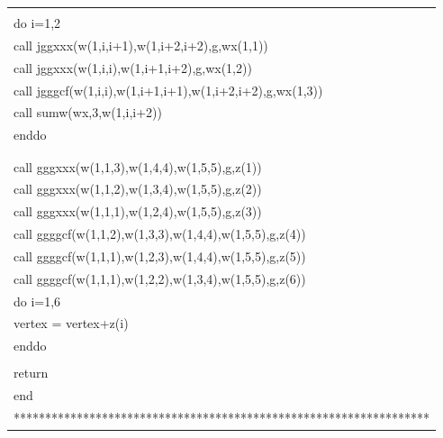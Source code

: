 \documentclass[a4paper,11pt]{article}
\begin{document}
\begin{center}
{\begin{supertabular}{l}
\\
         \\
      \hspace{0.5em} do i=1,2  \\
      \hspace{1em}    call jggxxx(w(1,i,i+1),w(1,i+2,i+2),g,wx(1,1))\\
      \hspace{1em}    call jggxxx(w(1,i,i),w(1,i+1,i+2),g,wx(1,2))    \\
      \hspace{1em}    call jgggcf(w(1,i,i),w(1,i+1,i+1),w(1,i+2,i+2),g,wx(1,3)) \\
      \hspace{1em}    call sumw(wx,3,w(1,i,i+2))\\
      \hspace{0.5em} enddo   \\
      \\
      \\
      \hspace{0.5em} call gggxxx(w(1,1,3),w(1,4,4),w(1,5,5),g,z(1))   \\
      \hspace{0.5em} call gggxxx(w(1,1,2),w(1,3,4),w(1,5,5),g,z(2))     \\
      \hspace{0.5em} call gggxxx(w(1,1,1),w(1,2,4),w(1,5,5),g,z(3))      \\
      \hspace{0.5em} call ggggcf(w(1,1,2),w(1,3,3),w(1,4,4),w(1,5,5),g,z(4))\\
      \hspace{0.5em} call ggggcf(w(1,1,1),w(1,2,3),w(1,4,4),w(1,5,5),g,z(5))  \\
      \hspace{0.5em} call ggggcf(w(1,1,1),w(1,2,2),w(1,3,4),w(1,5,5),g,z(6))    \\
      \hspace{0.5em} do i=1,6\\
      \hspace{1em}    vertex = vertex+z(i)\\
      \hspace{0.5em} enddo   \\
       \\
      \hspace{0.5em} return \\
      \hspace{0.5em} end\\
******************************************************************\\
\end{supertabular}
}      \\


\end{center}
\end{document}
